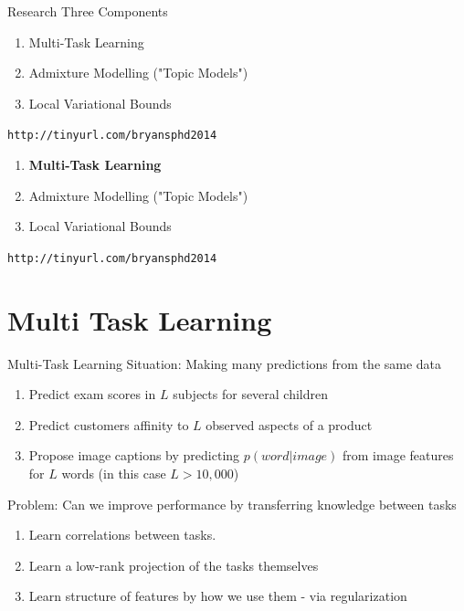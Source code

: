 \documentclass[xcolor=dvipsnames]{beamer}
\begin{document}
\begin{frame}{Research}
Three Components
 {
    \begin{enumerate}
        \item Multi-Task Learning
        \item Admixture Modelling ("Topic Models")
        \item Local Variational Bounds
    \end{enumerate}
}
 {
    \bigskip
    \texttt{http://tinyurl.com/bryansphd2014}
}

 {

    \begin{enumerate}
        \item { \bf Multi-Task Learning }
        \item {\color{gray} Admixture Modelling ("Topic Models")}
        \item {\color{gray} Local Variational Bounds}
    \end{enumerate}


}

 {
    \bigskip
    {\color{white} \texttt{http://tinyurl.com/bryansphd2014}}
}

\end{frame}




\section{Multi Task Learning}
\begin{frame}{Multi-Task Learning}
Situation: Making many predictions from the same data
\begin{enumerate}
    \item Predict exam scores in $L$ subjects for several children\cite{Bonilla2008}
    \item Predict customers affinity to $L$ observed aspects of a product\cite{Allenby1999}
    \item Propose image captions by predicting $p(word|image)$ from image features for $L$ words (in this case $L > 10,000$)\cite{Archambeau2011}
\end{enumerate}

\medskip 
\pause
Problem: Can we improve performance by transferring knowledge between tasks\cite{Caruana1997}
\begin{enumerate}
    \item Learn correlations between tasks.
    \item Learn a low-rank projection of the tasks themselves
    \item Learn structure of features by how we use them - via regularization
\end{enumerate}
\end{frame}
\end{document}
